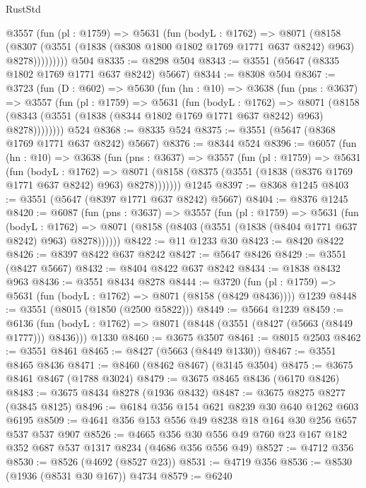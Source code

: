 \begin{lexlean}{RustStd}
\begin{coremodule}
          @3557
            (fun (pl : @1759) =>
            @5631
              (fun (bodyL : @1762) =>
              @8071
                (@8158
                  (@8307
                    (@3551 (@1838 (@8308 @1800 @1802 @1769 @1771 @637 @8242) @963) @8278)))))))))
    @504
@8335 := @8298 @504
@8343 := @3551 (@5647 (@8335 @1802 @1769 @1771 @637 @8242) @5667)
@8344 := @8308 @504
@8367 := @3723
    (fun (D : @602) =>
    @5630
      (fun (hn : @10) =>
      @3638
        (fun (pns : @3637) =>
        @3557
          (fun (pl : @1759) =>
          @5631
            (fun (bodyL : @1762) =>
            @8071
              (@8158 (@8343 (@3551 (@1838 (@8344 @1802 @1769 @1771 @637 @8242) @963) @8278))))))))
    @524
@8368 := @8335 @524
@8375 := @3551 (@5647 (@8368 @1769 @1771 @637 @8242) @5667)
@8376 := @8344 @524
@8396 := @6057
    (fun (hn : @10) =>
    @3638
      (fun (pns : @3637) =>
      @3557
        (fun (pl : @1759) =>
        @5631
          (fun (bodyL : @1762) =>
          @8071 (@8158 (@8375 (@3551 (@1838 (@8376 @1769 @1771 @637 @8242) @963) @8278)))))))
    @1245
@8397 := @8368 @1245
@8403 := @3551 (@5647 (@8397 @1771 @637 @8242) @5667)
@8404 := @8376 @1245
@8420 := @6087
    (fun (pns : @3637) =>
    @3557
      (fun (pl : @1759) =>
      @5631
        (fun (bodyL : @1762) =>
        @8071 (@8158 (@8403 (@3551 (@1838 (@8404 @1771 @637 @8242) @963) @8278))))))
@8422 := @11 @1233 @30
@8423 := @8420 @8422
@8426 := @8397 @8422 @637 @8242
@8427 := @5647 @8426
@8429 := @3551 (@8427 @5667)
@8432 := @8404 @8422 @637 @8242
@8434 := @1838 @8432 @963
@8436 := @3551 @8434 @8278
@8444 := @3720
    (fun (pl : @1759) => @5631 (fun (bodyL : @1762) => @8071 (@8158 (@8429 @8436))))
    @1239
@8448 := @3551 (@8015 (@1850 (@2500 @5822)))
@8449 := @5664 @1239
@8459 := @6136
    (fun (bodyL : @1762) => @8071 (@8448 (@3551 (@8427 (@5663 (@8449 @1777))) @8436)))
    @1330
@8460 := @3675 @3507
@8461 := @8015 @2503
@8462 := @3551 @8461
@8465 := @8427 (@5663 (@8449 @1330))
@8467 := @3551 @8465 @8436
@8471 := @8460 (@8462 @8467) (@3145 @3504)
@8475 := @3675 @8461 @8467 (@1788 @3024)
@8479 := @3675 @8465 @8436 (@6170 @8426)
@8483 := @3675 @8434 @8278 (@1936 @8432)
@8487 := @3675 @8275 @8277 (@3845 @8125)
@8496 := @6184 @356 @154 @621 @8239 @30 @640 @1262 @603 @6195
@8509 := @4641 @356 @153 @556 @49 @8238 @18 @164 @30 @256 @657 @537 @537 @907
@8526 := @4665 @356 @30 @556 @49 @760 @23 @167 @182 @352 @687 @537 @1317 @8234 (@4686 @356 @556 @49)
@8527 := @4712 @356
@8530 := @8526 (@4692 (@8527 @23))
@8531 := @4719 @356
@8536 := @8530 (@1936 (@8531 @30 @167)) @4734
@8579 := @6240

\end{coremodule}
\end{lexlean}
